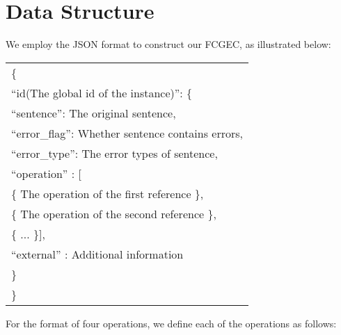 \documentclass[11pt]{article}
\begin{document}
\section{Data Structure}
\label{appendix:structure}

We employ the JSON format to construct our FCGEC, as illustrated below:
\begin{tcolorbox}[colback=white,colframe=black,arc=1mm, auto outer arc,
                  boxrule=0.5pt,
                  left=5pt,
                  top=1pt,
                  bottom=1pt
                  ]
                  
    \begin{tabular}[c]{@{}l@{}}
    \small \{ \\
    \small \quad ``id(The global id of the instance)'': \{ \\
    \small \quad \quad``sentence'': The original sentence, \\
    \small \quad \quad``error\_flag'':  Whether sentence contains errors, \\
    \small \quad \quad``error\_type'': The error types of sentence, \\  
    \small \quad \quad``operation'' : [ \\
    \small \quad \quad \quad\{ The operation of the first reference \}, \\
    \small \quad \quad \quad\{ The operation of the second reference \}, \\
    \small \quad \quad \quad\{ ... \}], \\
    \small \quad \quad``external'' : Additional information \\
    \small \quad\} \\
    \small \}
	\end{tabular}
\end{tcolorbox} 
For the format of four operations, we define each of the operations as follows:
\end{document}
